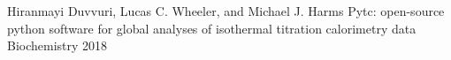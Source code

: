 

\begin{cvpublications}

  \cvpublication
    {Hiranmayi Duvvuri,  Lucas C. Wheeler, and Michael J. Harms} %
    {Pytc: open-source python software for global analyses of isothermal titration calorimetry data} %
    {Biochemistry} %
    {2018} %

\end{cvpublications}
